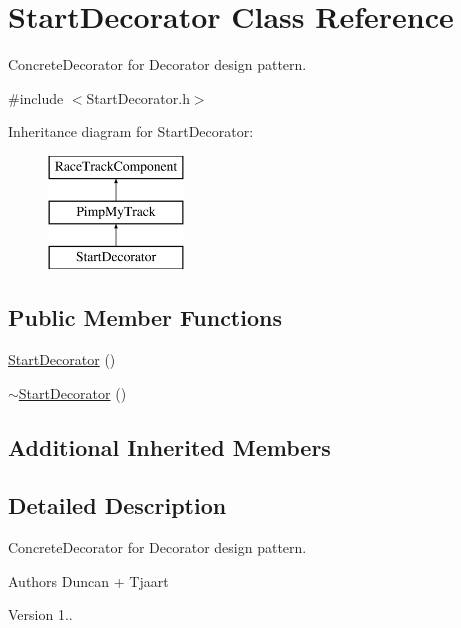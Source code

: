 \hypertarget{class_start_decorator}{}\section{Start\+Decorator Class Reference}
\label{class_start_decorator}


Concrete\+Decorator for Decorator design pattern.  




{\ttfamily \#include $<$Start\+Decorator.\+h$>$}

Inheritance diagram for Start\+Decorator\+:\begin{figure}[H]
\begin{center}
\leavevmode
\includegraphics[height=3.000000cm]{class_start_decorator}
\end{center}
\end{figure}
\subsection*{Public Member Functions}
\begin{DoxyCompactItemize}
\item 
\mbox{\hyperlink{class_start_decorator_aca165ccf1bf8ad0eb0e1ea487216f4bb}{Start\+Decorator}} ()
\item 
\mbox{\hyperlink{class_start_decorator_ab01d2430cb37d140c13c38374e24660e}{$\sim$\+Start\+Decorator}} ()
\end{DoxyCompactItemize}
\subsection*{Additional Inherited Members}


\subsection{Detailed Description}
Concrete\+Decorator for Decorator design pattern. 

\begin{DoxyAuthor}{Authors}
Duncan + Tjaart 
\end{DoxyAuthor}
\begin{DoxyVersion}{Version}
1.. 
\end{DoxyVersion}


